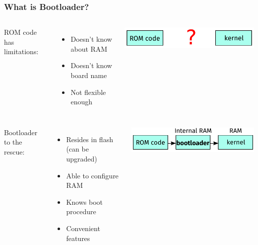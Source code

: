 \begin{frame}
  \frametitle{What is Bootloader?}
  \begin{columns}
      ROM code has limitations:
      \begin{itemize}
      \item Doesn't know about RAM
      \item Doesn't know board name
      \item Not flexible enough
      \end{itemize}
      \includegraphics[scale=0.85]{images/bootloader1.pdf}
  \end{columns}
  \pause
  \bigskip
  \begin{columns}
      Bootloader to the rescue:
      \begin{itemize}
      \item Resides in flash (can be upgraded)
      \item Able to configure RAM
      \item Knows boot procedure
      \item Convenient features
      \end{itemize}
      \includegraphics[scale=0.85]{images/bootloader2.pdf}
  \end{columns}
\end{frame}


